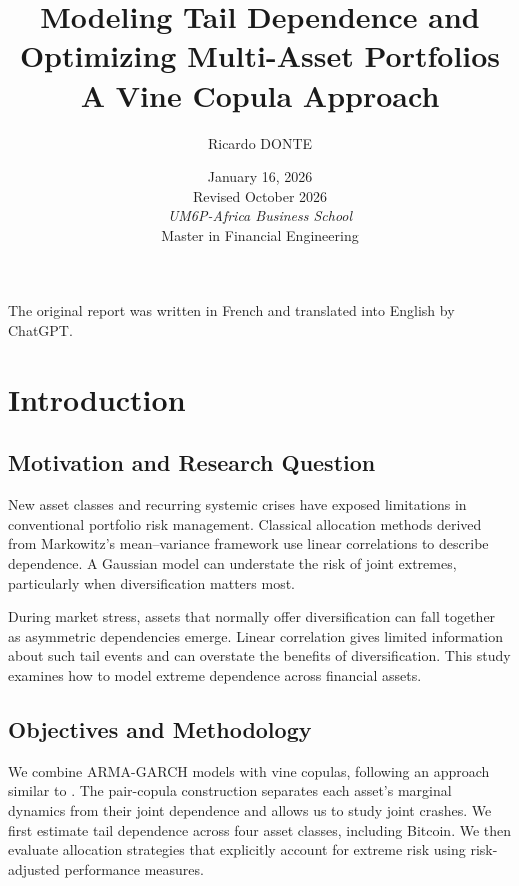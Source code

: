 \documentclass[12pt,a4paper]{article}
\title{\textbf{Modeling Tail Dependence and Optimizing Multi-Asset Portfolios}\\[1em]
\large A Vine Copula Approach}
\author{\Large Ricardo DONTE}
\date{January 16, 2026\\[0.3em]Revised October 2026\\[5em]
\textit{UM6P-Africa Business School}\\
Master in Financial Engineering}
\begin{document}
\maketitle
\thispagestyle{empty}
\begin{center}\small The original report was written in French and translated into English by ChatGPT.\end{center}
\vfill

\newpage

\tableofcontents
\newpage

\section{Introduction}
\subsection{Motivation and Research Question}

New asset classes and recurring systemic crises have exposed limitations in conventional portfolio risk management. Classical allocation methods derived from Markowitz's mean--variance framework use linear correlations to describe dependence. A Gaussian model can understate the risk of joint extremes, particularly when diversification matters most.

During market stress, assets that normally offer diversification can fall together as asymmetric dependencies emerge. Linear correlation gives limited information about such tail events and can overstate the benefits of diversification. This study examines how to model extreme dependence across financial assets.

\subsection{Objectives and Methodology}

We combine ARMA-GARCH models with vine copulas, following an approach similar to \cite{evkaya2024}. The pair-copula construction separates each asset's marginal dynamics from their joint dependence and allows us to study joint crashes. We first estimate tail dependence across four asset classes, including Bitcoin. We then evaluate allocation strategies that explicitly account for extreme risk using risk-adjusted performance measures.
\end{document}
